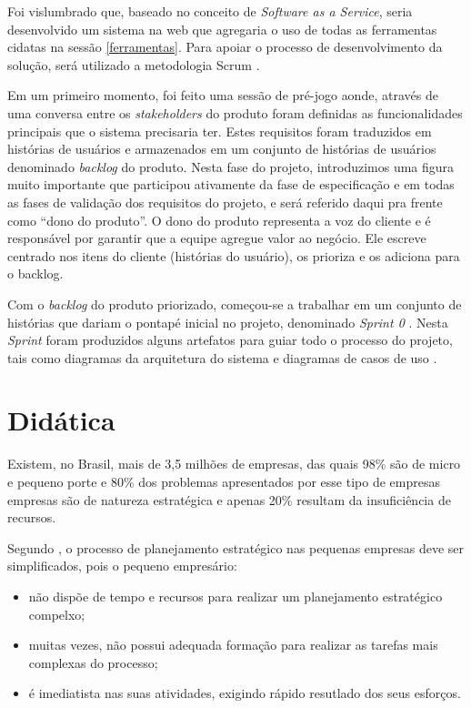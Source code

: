 \documentclass{abnt}
\begin{document}
Foi vislumbrado que, baseado no conceito de \textit{Software as a Service},
seria desenvolvido um sistema na web que agregaria o uso de todas as ferramentas
cidatas na sessão \ref{ferramentas}. Para apoiar o processo de desenvolvimento
da solução, será utilizado a metodologia Scrum \cite{sutherland2011scrum}.

Em um primeiro momento, foi feito uma sessão de pré-jogo \cite{sutherland2011scrum}
aonde, através de uma conversa entre os \textit{stakeholders} do produto foram
definidas as funcionalidades principais que o sistema precisaria ter. Estes
requisitos foram traduzidos em histórias de usuários e armazenados em um
conjunto de histórias de usuários denominado \textit{backlog} do produto. Nesta
fase do projeto, introduzimos uma figura muito importante que participou
ativamente da fase de especificação e em todas as fases de validação dos
requisitos do projeto, e será referido daqui pra frente como ``dono do
produto''. O dono do produto representa a voz do cliente e é responsável por
garantir que a equipe agregue valor ao negócio. Ele escreve centrado nos itens
do cliente (histórias do usuário), os prioriza e os adiciona para o backlog.

Com o \textit{backlog} do produto priorizado, começou-se a trabalhar em um
conjunto de histórias que dariam o pontapé inicial no projeto, denominado
\textit{Sprint 0} \cite{sutherland2011scrum}. Nesta \textit{Sprint} foram
produzidos alguns artefatos para guiar todo o processo do projeto, tais como
diagramas da arquitetura do sistema e diagramas de casos de uso \cite{sommerville2003engenharia}. 

\section{Didática}

Existem, no Brasil, mais de 3,5 milhões de empresas, das quais 98\% são de
micro e pequeno porte e 80\% dos problemas apresentados por esse tipo de
empresas empresas são de natureza estratégica e apenas 20\% resultam da
insuficiência de recursos.\cite{anaTerence} 

Segundo \cite{almeida1994desenvolvimento}, o processo de planejamento
estratégico nas pequenas empresas deve ser simplificados, pois o pequeno
empresário:

\begin{itemize}
	\item não dispõe de tempo e recursos para realizar um planejamento estratégico
	compelxo;
	\item muitas vezes, não possui adequada formação para realizar as tarefas mais
	complexas do processo;
	\item é imediatista nas suas atividades, exigindo rápido resutlado dos seus
	esforços.
\end{itemize}
\end{document}
